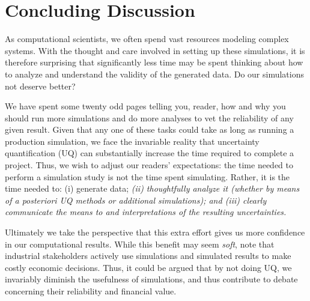 \section{Concluding Discussion}


As computational scientists, we often spend vast resources modeling complex systems.  With the thought and care involved in setting up these simulations, it is therefore surprising that  significantly less time may be spent thinking about how to analyze and understand the validity of the generated data.  Do our simulations not deserve better? 

We have spent some twenty odd pages telling you, reader, how and why you should run more simulations and do more analyses to vet the reliability of any given result.  Given that any one of these tasks could take as long as running a production simulation, we face the invariable reality that uncertainty quantification (UQ) can substantially increase the time required to complete a project.
Thus, we wish to adjust our readers' expectations: the time needed to perform a simulation study is not the time spent simulating.  Rather, it is the time needed to: (i) generate data; {\it (ii) thoughtfully analyze it (whether by means of a posteriori UQ methods or additional simulations); and (iii) clearly communicate the means to and interpretations of the resulting uncertainties.}


Ultimately we take the perspective that this extra effort gives us more confidence in our computational results.  While this benefit may seem {\it soft}, note that industrial stakeholders actively use simulations and simulated results to make costly economic decisions.  Thus, it could be argued that by not doing UQ, we invariably diminish the usefulness of simulations, and thus contribute to debate concerning their reliability and financial value.

